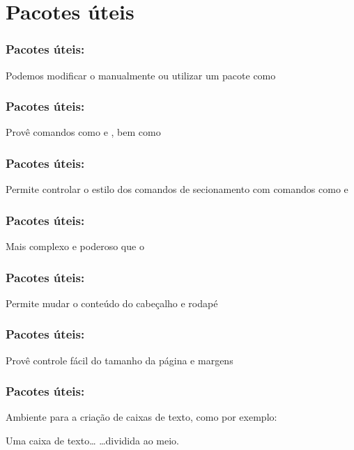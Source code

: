\section{Pacotes úteis}

\begin{frame}
  \frametitle{Pacotes úteis: }
  \LARGE
  Podemos modificar o \latexcode{\maketitle} manualmente ou utilizar um pacote
  como 
\end{frame}

\begin{frame}
  \frametitle{Pacotes úteis: }
  \LARGE
  Provê comandos como \latexcode{\pretitle} e \latexcode{\posttitle}, bem como
  \latexcode{\thetitle}
\end{frame}

\begin{frame}
  \frametitle{Pacotes úteis: }
  \LARGE
  Permite controlar o estilo dos comandos de secionamento com comandos como
  \latexcode{\allsectionfonts} e \latexcode{\sectionfont}
\end{frame}

\begin{frame}
  \frametitle{Pacotes úteis: }
  \LARGE
  Mais complexo e poderoso que o 
\end{frame}

\begin{frame}
  \frametitle{Pacotes úteis: }
  \LARGE
  Permite mudar o conteúdo do cabeçalho e rodapé
\end{frame}

\begin{frame}
  \frametitle{Pacotes úteis: }
  \LARGE
  Provê controle fácil do tamanho da página e margens
\end{frame}

\begin{frame}
  \frametitle{Pacotes úteis: }
  \LARGE
  Ambiente para a criação de caixas de texto, como por exemplo:
  \vfill

  \begin{tcolorbox}[title=Caixa de texto]
    Uma caixa de texto…
    \tcblower
    …dividida ao meio.
  \end{tcolorbox}
\end{frame}

